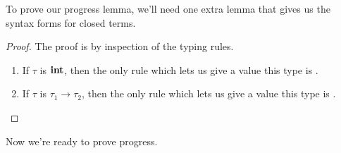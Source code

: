 To prove our progress lemma, we'll need one extra lemma that gives us the syntax forms for closed terms.


\begin{proof}
The proof is by inspection of the typing rules.
\begin{enumerate}
\item[i] If $\tau$ is $\mathbf{int}$, then the only rule which lets us give a value this type is .
\item[ii] If $\tau$ is $\tau_1 \to \tau_2$, then the only rule which lets us give a value this type is .
\end{enumerate}
\end{proof}

Now we're ready to prove progress.


